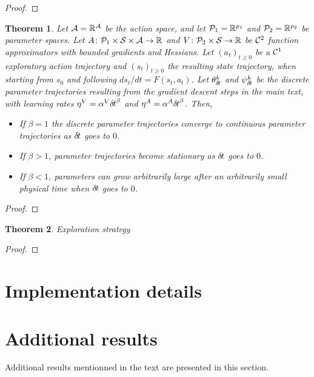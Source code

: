 \documentclass[11pt]{article}
\newtheorem{theorem}{Theorem}
\begin{document}
\begin{proof}
	
\end{proof}
\begin{theorem}
	Let $\cal A = \mathbb{R}^A$ be the action space, and let ${\cal P}_1 = \mathbb{R}^{p_1}$ and ${\cal P}_2 = \mathbb{R}^{p_2}$ be parameter spaces.  Let
	$A\colon {\cal P}_1 \times {\cal S} \times {\cal A} \rightarrow \mathbb{R}$
	and $V\colon {\cal P}_2 \times {\cal S} \rightarrow \mathbb{R}$ be ${\cal
	C}^2$ function approximators with bounded gradients and Hessians. Let
	$(a_t)_{t\geq 0}$ be a ${\cal C}^1$ exploratory action trajectory and
	$(s_t)_{t\geq 0}$ the resulting state trajectory, when starting from $s_0$ and
	following $ds_t/dt=F(s_t,a_t)$.  Let $\theta^k_{\delta\hspace{-.1em}t}$ and
	$\psi^k_{\delta\hspace{-.1em}t}$ be the discrete parameter trajectories resulting from
	the gradient descent steps in the main text, with
	learning rates $\eta^V = \alpha^V {\delta\hspace{-.1em}t}^\beta$ and $\eta^A = \alpha^A {\delta\hspace{-.1em}t}^\beta$. Then,
	\begin{itemize}
		\item If $\beta = 1$ the discrete parameter trajectories converge to continuous parameter
			trajectories as ${\delta\hspace{-.1em}t}$ goes to $0$.
		\item If $\beta > 1$, parameter trajectories become
		stationary as
			${\delta\hspace{-.1em}t}$ goes to $0$.
		\item If $\beta < 1$, parameters can grow arbitrarily large after an arbitrarily small physical time when ${\delta\hspace{-.1em}t}$ goes to $0$.
	\end{itemize}
\end{theorem}
\begin{proof}
	
	
\end{proof}

      \begin{theorem}
	Exploration strategy
\end{theorem}
\begin{proof}
	
\end{proof}
\section{Implementation details}

\section{Additional results}
Additional results mentionned in the text are presented in this section.

\end{document}
